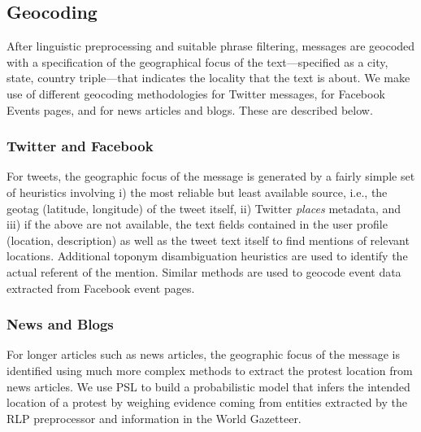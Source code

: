 \subsection{Geocoding}
\label{subsection:geocoding}
After linguistic preprocessing and suitable phrase filtering,
messages are geocoded with a
specification of the geographical focus of the text---specified as a
city, state, country triple---that indicates the locality that the
text is about. We make use of different geocoding methodologies
for Twitter messages, for Facebook Events pages, and for news articles and blogs.
These are described below.

\subsubsection{Twitter and Facebook}
For tweets, the geographic focus of the message is generated by a fairly simple
set of heuristics involving i) the most reliable but least available
source, i.e., the geotag (latitude, longitude) of the tweet itself, ii)
Twitter {\it places} metadata, and iii) if the above are not available,
the text fields contained in the user profile (location, description) as
well as the tweet text itself to find mentions of relevant locations.
Additional toponym disambiguation heuristics are used to identify the
actual referent of the mention.  Similar methods are used to geocode
event data extracted from Facebook event pages.  

\subsubsection{News and Blogs}
For longer articles such as news articles, the geographic focus of the message
is identified using much more complex methods to extract the protest
location from news articles. We use PSL to build a probabilistic model
that infers the intended location of a protest by weighing evidence
coming from entities extracted by the RLP preprocessor and information in the World
Gazetteer. 


